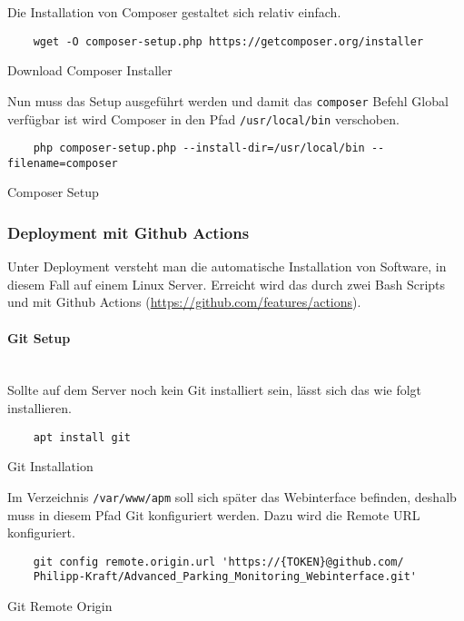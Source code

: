 Die Installation von Composer gestaltet sich relativ einfach.

\begin{listing}[H]
  \begin{verbatim}
    wget -O composer-setup.php https://getcomposer.org/installer
  \end{verbatim}
  \caption{Download Composer Installer}
\end{listing}

Nun muss das Setup ausgeführt werden und damit das \verb|composer| Befehl Global
verfügbar ist wird Composer in den Pfad \verb|/usr/local/bin| verschoben.

\begin{listing}[H]
  \begin{verbatim}
    php composer-setup.php --install-dir=/usr/local/bin --filename=composer
  \end{verbatim}
  \caption{Composer Setup}
\end{listing}


\subsubsection{Deployment mit Github Actions}
Unter Deployment versteht man die automatische Installation von Software, in
diesem Fall auf einem Linux Server. Erreicht wird das durch zwei Bash Scripts
und mit Github Actions (\url{https://github.com/features/actions}).

\paragraph{Git Setup}\mbox{}\\

Sollte auf dem Server noch kein Git installiert sein, lässt sich das wie folgt
installieren.

\begin{listing}[H]
  \begin{verbatim}
    apt install git
  \end{verbatim}
  \caption{Git Installation}
\end{listing}

Im Verzeichnis \verb|/var/www/apm| soll sich später das Webinterface befinden,
deshalb muss in diesem Pfad Git konfiguriert werden. Dazu wird die Remote URL
konfiguriert.

\begin{listing}[H]
  \begin{verbatim}
    git config remote.origin.url 'https://{TOKEN}@github.com/
    Philipp-Kraft/Advanced_Parking_Monitoring_Webinterface.git'
  \end{verbatim}
  \caption{Git Remote Origin}
\end{listing}

